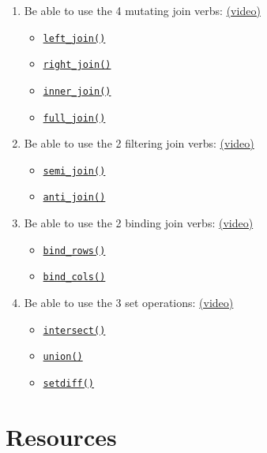 \documentclass[
  oneside]{book}
\providecommand{\tightlist}{%
  \setlength{\itemsep}{0pt}\setlength{\parskip}{0pt}}
\begin{document}
\begin{enumerate}
\def\labelenumi{\arabic{enumi}.}
\tightlist
\item
  Be able to use the 4 mutating join verbs: \href{https://youtu.be/WV0yg6f3DNM}{(video)}

  \begin{itemize}
  \tightlist
  \item
    \protect\hyperlink{left_join}{\texttt{left\_join()}}
  \item
    \protect\hyperlink{right_join}{\texttt{right\_join()}}
  \item
    \protect\hyperlink{inner_join}{\texttt{inner\_join()}}
  \item
    \protect\hyperlink{full_join}{\texttt{full\_join()}}
  \end{itemize}
\item
  Be able to use the 2 filtering join verbs: \href{https://youtu.be/ijoCEKifefQ}{(video)}

  \begin{itemize}
  \tightlist
  \item
    \protect\hyperlink{semi_join}{\texttt{semi\_join()}}
  \item
    \protect\hyperlink{anti_join}{\texttt{anti\_join()}}
  \end{itemize}
\item
  Be able to use the 2 binding join verbs: \href{https://youtu.be/8RWdNhbVZ4I}{(video)}

  \begin{itemize}
  \tightlist
  \item
    \protect\hyperlink{bind_rows}{\texttt{bind\_rows()}}
  \item
    \protect\hyperlink{bind_cols}{\texttt{bind\_cols()}}
  \end{itemize}
\item
  Be able to use the 3 set operations: \href{https://youtu.be/c3V33ElWUYI}{(video)}

  \begin{itemize}
  \tightlist
  \item
    \protect\hyperlink{intersect}{\texttt{intersect()}}
  \item
    \protect\hyperlink{union}{\texttt{union()}}
  \item
    \protect\hyperlink{setdiff}{\texttt{setdiff()}}
  \end{itemize}
\end{enumerate}

\hypertarget{resources6}{%
\section{Resources}\label{resources6}}
\end{document}
